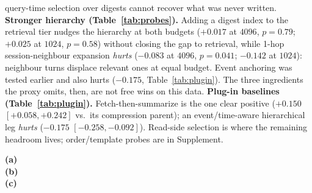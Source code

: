 \documentclass{article} %
\begin{document}
query-time selection over digests cannot recover what was never written.
\textbf{Stronger hierarchy (Table~\ref{tab:probes}).} Adding a digest index to the
retrieval tier nudges the hierarchy at both budgets ($+0.017$ at $4096$, $p{=}0.79$;
$+0.025$ at $1024$, $p{=}0.58$) without closing the gap to retrieval, while 1-hop
session-neighbour expansion \emph{hurts} ($-0.083$ at $4096$, $p{=}0.041$; $-0.142$ at
$1024$): neighbour turns displace relevant ones at equal budget. Event anchoring was
tested earlier and also hurts ($-0.175$, Table~\ref{tab:plugin}). The three ingredients the
proxy omits, then, are not free wins on this data.
\textbf{Plug-in baselines (Table~\ref{tab:plugin}).} Fetch-then-summarize is the one clear
positive ($+0.150$ $[+0.058,+0.242]$ vs.\ its compression parent); an event/time-aware
hierarchical leg \emph{hurts} ($-0.175$ $[-0.258,-0.092]$). Read-side selection is where the
remaining headroom lives; order/template probes are in Supplement.

\begin{table}[h]
\centering\scriptsize
\caption{Sensitivity ablations (relaxed EM; GLM-4.x probe generation, $n{=}120$, reader fixed
within each block; read within-table only).
\textbf{(a)}~Summarizer length (\texttt{ablation\_summary\_len.tex}).
\textbf{(b)}~Hierarchical tier allocation (\texttt{ablation\_allocation.tex}).
\textbf{(c)}~Retriever family (\texttt{ablation\_retrieval.tex}).}
\label{tab:ablations}
\textbf{(a)}\quad\\[4pt]
\textbf{(b)}\quad\\[4pt]
\textbf{(c)}\quad
\end{table}

\begin{table}[h]
\centering\scriptsize
\caption{Plug-in baselines (relaxed EM; GLM-4.x probe generation, $n{=}120$). $\Delta$@4096 is
versus the named parent. Absolute values are \emph{not} directly comparable to the main grid
and are read within-table only; Source \texttt{tables/plug\_baselines.tex}.}
\label{tab:plugin}

\end{table}

\begin{table}[h]
\centering\scriptsize
\caption{Hierarchy under a stronger retrieval design ($120$-question subset): two ingredients
the fixed-split proxy lacks, each added to the same $25/50/25$ baseline. Rows are paired
within the table. Source \texttt{tables500/probes.tex}.}
\label{tab:probes}

\end{table}
\end{document}

